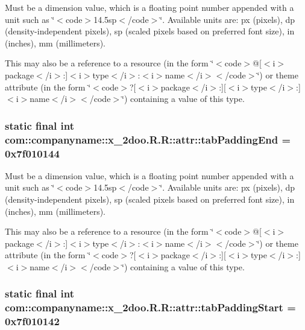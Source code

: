 Must be a dimension value, which is a floating point number appended with a unit such as \char`\"{}$<$code$>$14.5sp$<$/code$>$\char`\"{}. Available units are: px (pixels), dp (density-independent pixels), sp (scaled pixels based on preferred font size), in (inches), mm (millimeters). 

This may also be a reference to a resource (in the form \char`\"{}$<$code$>$@\mbox{[}$<$i$>$package$<$/i$>$:\mbox{]}$<$i$>$type$<$/i$>$:$<$i$>$name$<$/i$>$$<$/code$>$\char`\"{}) or theme attribute (in the form \char`\"{}$<$code$>$?\mbox{[}$<$i$>$package$<$/i$>$:\mbox{]}\mbox{[}$<$i$>$type$<$/i$>$:\mbox{]}$<$i$>$name$<$/i$>$$<$/code$>$\char`\"{}) containing a value of this type. \hypertarget{classcom_1_1companyname_1_1x__2doo_1_1_r_1_1attr_3efb6af986d758781acf5fa284a602e3}{
\subsubsection[{tabPaddingEnd}]{\setlength{\rightskip}{0pt plus 5cm}static final int com::companyname::x\_\-2doo.R.R::attr::tabPaddingEnd = 0x7f010144}}
\label{classcom_1_1companyname_1_1x__2doo_1_1_r_1_1attr_3efb6af986d758781acf5fa284a602e3}


Must be a dimension value, which is a floating point number appended with a unit such as \char`\"{}$<$code$>$14.5sp$<$/code$>$\char`\"{}. Available units are: px (pixels), dp (density-independent pixels), sp (scaled pixels based on preferred font size), in (inches), mm (millimeters). 

This may also be a reference to a resource (in the form \char`\"{}$<$code$>$@\mbox{[}$<$i$>$package$<$/i$>$:\mbox{]}$<$i$>$type$<$/i$>$:$<$i$>$name$<$/i$>$$<$/code$>$\char`\"{}) or theme attribute (in the form \char`\"{}$<$code$>$?\mbox{[}$<$i$>$package$<$/i$>$:\mbox{]}\mbox{[}$<$i$>$type$<$/i$>$:\mbox{]}$<$i$>$name$<$/i$>$$<$/code$>$\char`\"{}) containing a value of this type. \hypertarget{classcom_1_1companyname_1_1x__2doo_1_1_r_1_1attr_3bfcf0810624473088f98ee2b0fd0fd5}{
\subsubsection[{tabPaddingStart}]{\setlength{\rightskip}{0pt plus 5cm}static final int com::companyname::x\_\-2doo.R.R::attr::tabPaddingStart = 0x7f010142}}
\label{classcom_1_1companyname_1_1x__2doo_1_1_r_1_1attr_3bfcf0810624473088f98ee2b0fd0fd5}


